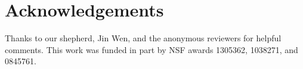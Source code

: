 \documentclass{sig-alternate-2013}
\begin{document}








%




\section{Acknowledgements}
Thanks to our shepherd, Jin Wen, and the anonymous reviewers for helpful comments. This work was funded in part by NSF awards 1305362, 1038271, and 0845761.


\small


\end{document}
